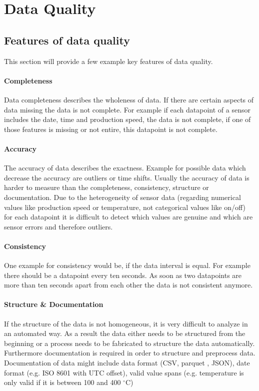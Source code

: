 \chapter{Data Quality}

\section{Features of data quality}\label{section:data-quality-features}
This section will provide a few example key features of data quality. 
\subsubsection{Completeness}
Data completeness describes the wholeness of data. If there are certain aspects of data missing the data is not complete. For example if each datapoint of a sensor includes the date, time and production speed, the data is not complete, if one of those features is missing or not entire, this datapoint is not complete. \cite{caiChallengesDataQuality2015, songIoTDataQuality2020}
\subsubsection{Accuracy}
The accuracy of data describes the exactness. Example for possible data which decrease the accuracy are outliers or time shifts. Usually the accuracy of data is harder to measure than the completeness, consistency, structure or documentation. Due to the heterogeneity of sensor data (regarding numerical values like production speed or temperature, not categorical values like on/off) for each datapoint it is difficult to detect which values are genuine and which are sensor errors and therefore outliers. \cite{caiChallengesDataQuality2015}
\subsubsection{Consistency}
One example for consistency would be, if the data interval is equal. For example there should be a datapoint every ten seconds. As soon as two datapoints are more than ten seconds apart from each other the data is not consistent anymore. \cite{caiChallengesDataQuality2015}
\subsubsection{Structure \& Documentation}
If the structure of the data is not homogeneous, it is very difficult to analyze in an automated way. As a result the data either needs to be structured from the beginning or a process needs to be fabricated to structure the data automatically. Furthermore documentation is required in order to structure and preprocess data. Documentation of data might include data format (\ac{CSV}, parquet \cite{ApacheParquet2021}, \ac{JSON}), date format (e.g. ISO 8601 with UTC offset), valid value spans (e.g. temperature is only valid if it is between 100 and 400 $^{\circ}$C)
\cite{caiChallengesDataQuality2015}

